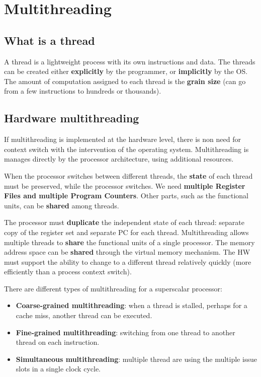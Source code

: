 \section{Multithreading}

\subsection{What is a thread}

A thread is a lightweight process with its own instructions and data. The threads can be created either \textbf{explicitly} by the programmer, or \textbf{implicitly} by the OS. The amount of computation assigned to each thread is the \textbf{grain size} (can go from a few instructions to hundreds or thousands).

\subsection{Hardware multithreading}

If multithreading is implemented at the hardware level, there is non need for context switch with the intervention of the operating system. Multithreading is manages directly by the processor architecture, using additional resources.

When the processor switches between different threads, the \textbf{state} of each thread must be preserved, while the processor switches. We need \textbf{multiple Register Files and multiple Program Counters}. Other parts, such as the functional units, can be \textbf{shared} among threads.

The processor must \textbf{duplicate} the independent state of each thread: separate copy of the register set and separate PC for each thread. Multithreading allows multiple threads to \textbf{share} the functional units of a single processor. The memory address space can be \textbf{shared} through the virtual memory mechanism. The HW must support the ability to change to a different thread relatively quickly (more efficiently than a process context switch).

There are different types of multithreading for a superscalar processor:

\begin{itemize}
	\item \textbf{Coarse-grained multithreading}: when a thread is stalled, perhaps for a cache miss, another thread can be executed.
	\item \textbf{Fine-grained multithreading}: switching from one thread to another thread on each instruction.
	\item \textbf{Simultaneous multithreading}: multiple thread are using the multiple issue slots in a single clock cycle.
\end{itemize}


